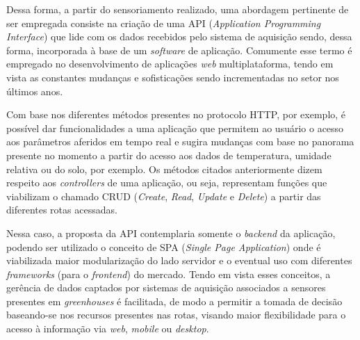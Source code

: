 \documentclass[a4paper, 12pt]{article}
\begin{document}
	Dessa forma, a partir do sensoriamento  realizado, uma abordagem pertinente de ser empregada consiste na criação de uma API (\textit{Application Programming Interface}) que lide com os dados recebidos pelo sistema de aquisição sendo, dessa forma, incorporada à base de um \textit{software} de aplicação. Comumente esse termo é empregado no desenvolvimento de aplicações \textit{web} multiplataforma, tendo em vista as constantes mudanças e sofisticações sendo incrementadas no setor nos últimos anos. 
	
	Com base nos diferentes métodos presentes no protocolo HTTP, por exemplo, é possível dar funcionalidades a uma aplicação que permitem ao usuário o acesso aos parâmetros aferidos em tempo real e sugira mudanças com base no panorama presente no momento a partir do acesso aos dados de temperatura, umidade relativa ou do solo, por exemplo. Os métodos citados anteriormente dizem respeito aos \textit{controllers} de uma aplicação, ou seja, representam funções que viabilizam o chamado CRUD (\textit{Create}, \textit{Read}, \textit{Update} e \textit{Delete}) a partir das diferentes rotas acessadas. 
	
	Nessa caso, a proposta da API contemplaria somente o \textit{backend} da aplicação, podendo ser utilizado o conceito de SPA (\textit{Single Page Application}) onde é viabilizada maior modularização do lado servidor e o eventual uso com diferentes \textit{frameworks} (para o \textit{frontend}) do mercado. Tendo em vista esses conceitos, a gerência de dados captados por sistemas de aquisição associados a sensores presentes em \textit{greenhouses} é facilitada, de modo a permitir a tomada de decisão baseando-se nos recursos presentes nas rotas, visando maior flexibilidade para o acesso à informação via \textit{web}, \textit{mobile} ou \textit{desktop}.
\end{document}
